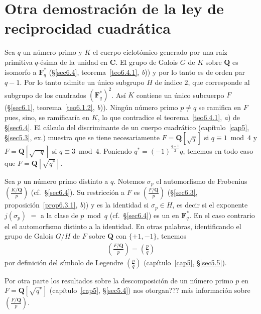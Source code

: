\documentclass[bibtotoc,leqno,spanish]{amsbook}
\let\emph\relax %
\newcommand{\QQ}{\mathbf{Q}}
\newcommand{\FF}{\mathbf{F}}
\newcommand{\CC}{\mathbf{C}}
\numberwithin{equation}{section}
\theoremstyle{note}
\theoremstyle{note}
\theoremstyle{rem}
\numberwithin{theorem}{section}
\numberwithin{proposition}{section}
\numberwithin{definition}{section}
\numberwithin{lemma}{section}
\numberwithin{corollary}{section}
\numberwithin{example}{section}
\numberwithin{footnote}{section}%
\begin{document}
\section{Otra demostraci\'on de la ley de reciprocidad cuadr\'atica}

Sea $q$ un n\'umero primo \emph{impar} y $K$ el cuerpo ciclot\'omico generado por una ra\'iz primitiva
$q$-\'esima de la unidad en $\CC$. El grupo de Galois $G$ de $K$ sobre $\QQ$ es isomorfo a $\FF_{q}^{*}$
(\S\ref{sec6.4}, teorema~\ref{teo6.4.1}, {\itshape b})) y por lo tanto es \emph{c\'iclico} de orden par $q-1$. Por lo tanto admite
un \'unico subgrupo $H$ de \'indice $2$, que corresponde al subgrupo de los cuadrados $(\FF_{q}^{*})^{2}$.
As\'i $K$ contiene un \'unico subcuerpo \emph{cuadr\'atico} $F$ (\S\ref{sec6.1}, teorema~\ref{teo6.1.2}, {\itshape b})). Ning\'un n\'umero
primo $p\neq q$ se ramifica en $F$ pues, sino, se ramificar\'ia en $K$, lo que contradice el teorema~\ref{teo6.4.1}, {\itshape a})
de \S\ref{sec6.4}. El c\'alculo del discriminante de un cuerpo cuadr\'atico (cap\'itulo~\ref{cap5}, \S\ref{sec5.3}, ex.) muestra que
se tiene necesariamente $F=\QQ[\sqrt{q}]$ si $q\equiv 1\bmod 4$ y $F = \QQ[\sqrt{-q}]$ si $q\equiv 3\bmod 4$.
Poniendo $q^{*} = (-1)^{\frac{q-1}{2}}q$, tenemos en todo caso que $F = \QQ[\sqrt{q^{*}}]$.

Sea $p$ un n\'umero primo distinto a $q$. Notemos $\sigma_{p}$ el automorfismo de Frobenius
$\left(\frac{K/\QQ}{p}\right)$ (cf.~\S\ref{sec6.4}). Su restricci\'on a $F$ es $\left(\frac{F/\QQ}{p}\right)$
(\S\ref{sec6.3}, proposici\'on~\ref{prop6.3.1}, {\itshape b})) y es la identidad si $\sigma_{p}\in H$, es decir si el exponente $j(\sigma_{p})$
$=$ a la clase de $p\bmod q$ (cf.~\S\ref{sec6.4}) es un \emph{cuadrado} en $\FF_{q}^{*}$. En el caso contrario el el
automorfismo distinto a la identidad. En otras palabras, identificando el grupo de Galois $G/H$ de $F$ sobre
$\QQ$ con $\{+1,-1\}$, tenemos
\begin{gather}\label{eq-6.5-1}
\left(\frac{F/\QQ}{p}\right) = \left(\frac{p}{q}\right)
\end{gather}
por definici\'on del s\'imbolo de Legendre $\left(\frac{p}{q}\right)$ (cap\'itulo~\ref{cap5}, \S\ref{sec5.5}).

Por otra parte los resultados sobre la descomposici\'on de un n\'umero primo $p$ en $F = \QQ[\sqrt{q^{*}}]$
(cap\'itulo~\ref{cap5}, \S\ref{sec5.4}) nos otorgan??? m\'as informaci\'on sobre $\left(\frac{F/\QQ}{p}\right)$.
\end{document}

